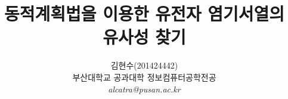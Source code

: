 \documentclass[10pt,a4paprt]{article}
\title{동적계획법을 이용한 유전자 염기서열의 유사성 찾기}
\author{ 김현수(201424442) \\[3mm]
		 부산대학교 공과대학 정보컴퓨터공학전공 \\[3mm]
		 \textit{alcatra@pusan.ac.kr}
	   }
\begin{document}
\begin{spacing}{1.6}
\maketitle 
\tableofcontents

\end{spacing}
\end{document}
